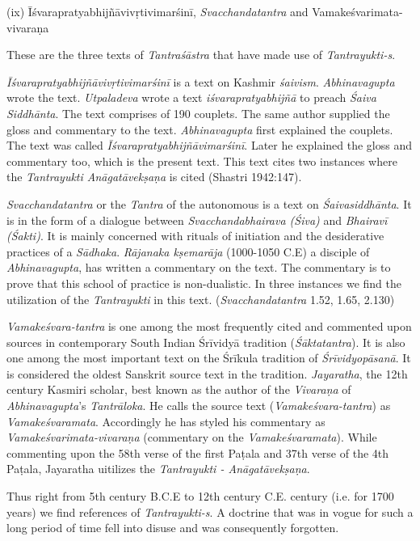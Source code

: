 (ix) Īśvarapratyabhijñāvivṛtivimarśinī, \textit{Svacchandatantra} and Vama\-keśvarimata-vivaraṇa

These are the three texts of \textit{Tantraśāstra} that have made use of \textit{Tantrayukti-s}.

\textit{Īśvarapratyabhijñāvivṛtivimarśinī} is a text on Kashmir \textit{śaivism}. \textit{Abhinavagupta} wrote the text. \textit{Utpaladeva} wrote a text \textit{iśvarapratyabhijñā} to preach \textit{Śaiva Siddhānta}. The text comprises of 190 couplets. The same author supplied the gloss and commentary to the text. \textit{Abhinavagupta} first explained the couplets. The text was called \textit{Īśvarapratyabhijñāvimarśinī}. Later he explained the gloss and commentary too, which is the present text. This text cites two instances where the \textit{Tantrayukti Anāgatāvekṣaṇa} is cited (Shastri 1942:147).

\textit{Svacchandatantra} or the \textit{Tantra} of the autonomous is a text on \textit{Śaivasiddhānta}. It is in the form of a dialogue between \textit{Svacchandabhairava (Śiva)} and \textit{Bhairavī (Śakti)}. It is mainly concerned with rituals of initiation and the desiderative practices of a \textit{Sādhaka}. \textit{Rājanaka kṣemarāja} (1000-1050 C.E) a disciple of \textit{Abhinavagupta}, has written a commentary on the text. The commentary is to prove that this school of practice is non-dualistic. In three instances we find the utilization of the \textit{Tantrayukti} in this text. (\textit{Svacchandatantra} 1.52, 1.65, 2.130)

\textit{Vamakeśvara-tantra} is one among the most frequently cited and commented upon sources in contemporary South Indian Śrīvidyā tradition (\textit{Śāktatantra}). It is also one among the most important text on the Śrīkula tradition of \textit{Śrīvidyopāsanā}. It is considered the oldest Sanskrit source text in the tradition. \textit{Jayaratha}, the 12th century Kasmiri scholar, best known as the author of the \textit{Vivaraṇa} of \textit{Abhinavagupta}’s \textit{Tantrāloka}. He calls the source text (\textit{Vamakeśvara-tantra}) as \textit{Vamakeśvaramata}. Accordingly he has styled his commentary as \textit{Vamakeśvarimata-vivaraṇa} (commentary on the \textit{Vamakeśvaramata}). While commenting upon the 58th verse of the first Paṭala and 37th verse of the 4th Paṭala, Jayaratha uitilizes the \textit{Tantrayukti - Anāgatāvekṣaṇa}.

Thus right from 5th century B.C.E to 12th century C.E. century (i.e. for 1700 years) we find references of \textit{Tantrayukti-s}. A doctrine that was in vogue for such a long period of time fell into disuse and was consequently forgotten.


